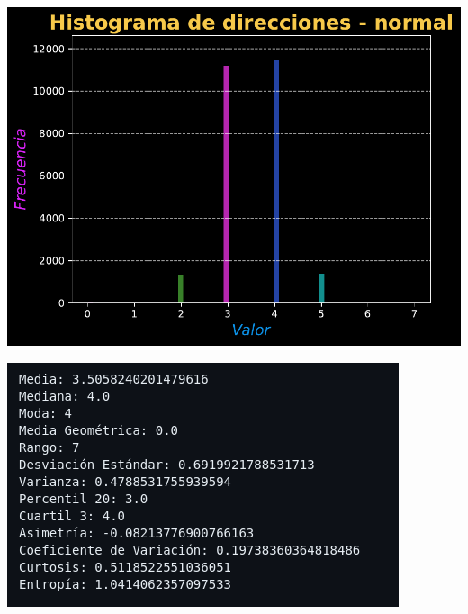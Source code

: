 \documentclass[11pt]{article} %
\begin{document}
	 \begin{multicols}{2}
	 	\begin{minipage}{\linewidth}
	 		\centering
	 		\includegraphics[width=0.9\linewidth]{hist_direcciones_normal.pdf}
	 		\label{fig:direcNormalHist}
	 	\end{minipage}
	 	\vfill\columnbreak
	 	\begin{minipage}{\linewidth}
	 		\centering
	 		\includegraphics[width=1\linewidth]{n1.png}%
	 		\label{direcNormalMet}
	 	\end{minipage}
	 \end{multicols}
	 
\end{document}
